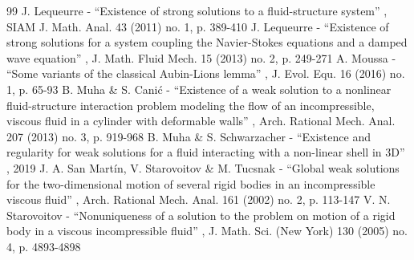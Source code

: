 \documentclass[11pt]{article}
\theoremstyle{remark}
\theoremstyle{definition}
\begin{document}
\begin{thebibliography}{99}
 J. Lequeurre - “Existence of strong solutions to a fluid-structure system” , SIAM J. Math. Anal. 43 (2011) no. 1, p. 389-410
 J. Lequeurre - “Existence of strong solutions for a system coupling the Navier-Stokes equations and a damped wave equation” , J. Math. Fluid Mech. 15 (2013) no. 2, p. 249-271
 A. Moussa - “Some variants of the classical Aubin-Lions lemma” , J. Evol. Equ. 16 (2016) no. 1, p. 65-93
 B. Muha \& S. Canić - “Existence of a weak solution to a nonlinear fluid-structure interaction problem modeling the flow of an incompressible, viscous fluid in a cylinder with deformable walls” , Arch. Rational Mech. Anal. 207 (2013) no. 3, p. 919-968
 B. Muha \& S. Schwarzacher - “Existence and regularity for weak solutions for a fluid interacting with a non-linear shell in 3D” , 2019
 J. A. San Martín, V. Starovoitov \& M. Tucsnak - “Global weak solutions for the two-dimensional motion of several rigid bodies in an incompressible viscous fluid” , Arch. Rational Mech. Anal. 161 (2002) no. 2, p. 113-147
 V. N. Starovoitov - “Nonuniqueness of a solution to the problem on motion of a rigid body in a viscous incompressible fluid” , J. Math. Sci. (New York) 130 (2005) no. 4, p. 4893-4898
\end{thebibliography}
\end{document}
